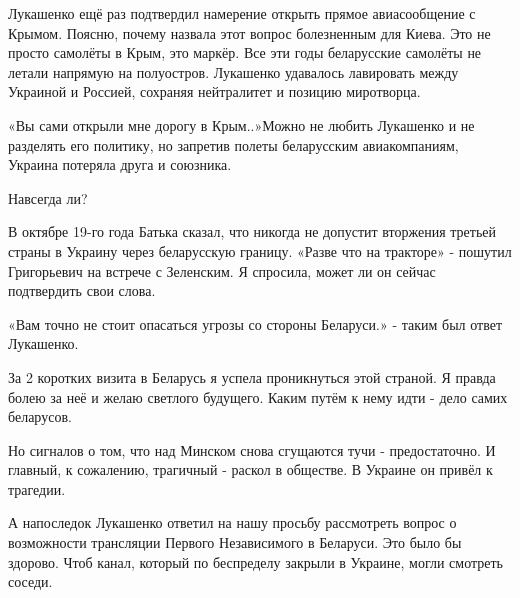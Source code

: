 Лукашенко ещё раз подтвердил намерение открыть прямое авиасообщение с Крымом.
Поясню, почему назвала этот вопрос болезненным для Киева. Это не просто
самолёты в Крым, это маркёр. Все эти годы беларусские самолёты не летали
напрямую на полуостров. Лукашенко удавалось лавировать между Украиной и
Россией, сохраняя нейтралитет и позицию миротворца. 

«Вы сами открыли мне дорогу в Крым..»Можно не любить Лукашенко и не разделять
его политику, но запретив полеты беларусским авиакомпаниям, Украина потеряла
друга и союзника. 

Навсегда ли? 

В октябре 19-го года Батька сказал, что никогда не допустит вторжения третьей
страны   в Украину через беларусскую границу. «Разве что на тракторе» - пошутил
Григорьевич на встрече с Зеленским. Я спросила, может ли он сейчас подтвердить
свои слова. 

«Вам точно не стоит опасаться угрозы со стороны Беларуси.» - таким был ответ
Лукашенко. 

За 2 коротких визита в Беларусь я успела проникнуться этой страной. Я правда
болею за неё и желаю светлого будущего. Каким путём к нему идти - дело самих
беларусов. 

Но сигналов о том, что над Минском снова сгущаются тучи - предостаточно. И
главный, к сожалению, трагичный - раскол в обществе. В Украине он привёл к
трагедии. 

А напоследок Лукашенко ответил на нашу просьбу рассмотреть вопрос о возможности
трансляции Первого Независимого в Беларуси. Это было бы здорово. Чтоб канал,
который по беспределу закрыли в Украине, могли смотреть соседи.
